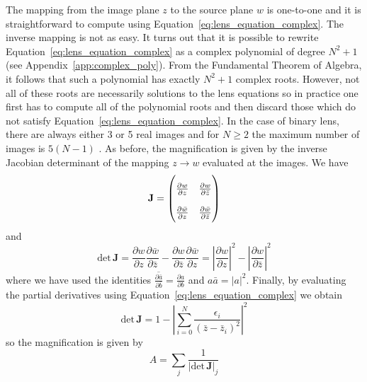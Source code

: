 \documentclass[12pt,dvipsnames]{report}
\begin{document}
The mapping from the image plane $z$ to the source plane $w$ is one-to-one and
it is straightforward to compute using Equation~\ref{eq:lens_equation_complex}.
The inverse mapping is not as easy. It turns out that it is possible to rewrite
Equation~\ref{eq:lens_equation_complex} as a complex polynomial of degree $N^2
    + 1$ (see Appendix~\ref{app:complex_poly}). From the Fundamental Theorem of
Algebra, it follows that such a polynomial has exactly $N^2+1$ complex roots.
However, not all of these roots are necessarily solutions to the lens equations
so in practice one first has to compute all of the polynomial roots and then
discard those which do not satisfy Equation~\ref{eq:lens_equation_complex}. In
the case of binary lens, there are always either 3 or 5 real images and for
$N\geq 2$ the maximum number of images is $5(N-1)$
\citep{arXiv:astro-ph/0103463,astro-ph/0305166,arXiv:math/0401188v2}. As
before, the magnification is given by the inverse Jacobian determinant of the
mapping $z\rightarrow w$ evaluated at the images. We have
\begin{equation}
    \mathbf{J}=
    \renewcommand\arraystretch{2}
    \begin{pmatrix}
        \frac{\partial w}{\partial z} & \frac{\partial w}{\partial \bar{z}} \\ \frac{\partial \bar{w}}{\partial z} & \frac{\partial \bar{w}}{\partial \bar{z}}
    \end{pmatrix}
\end{equation}
and
\begin{equation}
    \mathrm{det}\,\mathbf{J}=\frac{\partial w}{\partial z}\frac{\partial \bar{w}}{\partial \bar{z}} - \frac{\partial w}{\partial \bar{z}}\frac{\partial \bar{w}}{\partial z} = \left|\frac{\partial w}{\partial z}\right|^2 - \left|\frac{\partial w}{\partial \bar{z}}\right|^2
\end{equation}
where we have used the identities
$\overline{\frac{\partial\bar a}{\partial{\bar b}}}=\frac{\partial a}{\partial{b}}$ and $a\bar a=|a|^2$. Finally, by evaluating the partial derivatives
using Equation~\ref{eq:lens_equation_complex} we obtain
\begin{equation}
    \mathrm{det} \,\mathbf J=1-\left|\sum_{i=0}^{N} \frac{\epsilon_{i}}{\left(\bar{z}-\bar{z}_i\right)^{2}}\right|^{2}
    \label{eq:lens_eq_det_jac}
\end{equation}
so the magnification is given by
\begin{equation}
    A = \sum_j \frac{1}{\left|\mathrm{det}\,\mathbf J\right|_j}
\end{equation}
\end{document}
